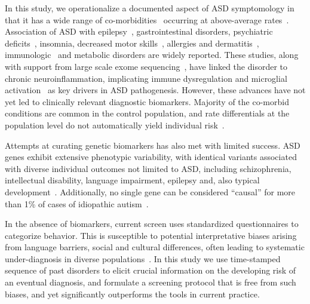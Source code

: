 \documentclass[3p,super,numbers,sort&compress,preprint,10pt]{elsarticle}
\begin{document}
In this study, we operationalize a documented aspect of ASD symptomology in  that it has   a wide range  of co-morbidities~\cite{pmid22511918,pmid30733689,pmid25681541} occurring at above-average  rates~\cite{hyman2020identification}.
%
Association of ASD  with epilepsy~\cite{pmid23935565}, gastrointestinal disorders\cite{pmid30646068,pmid21651783,pmid30823414,pmid21282636,pmid29028817,pmid30109601}, psychiatric deficits~\cite{pmid24729779}, insomnia, decreased motor skills~\cite{pmid30337860}, allergies and  dermatitis~\cite{pmid30646068,pmid21651783,pmid30823414,pmid21282636,pmid29028817,pmid30109601}, immunologic~\cite{pmid30971960,pmid30941018,pmid29691724,pmid29307081,pmid27351598,pmid26793298,pmid30095240,pmid25681541} and metabolic\cite{pmid30178105,pmid27957319,pmid29028817} disorders are  widely reported. These studies, along with support from large scale exome sequencing~\cite{Satterstrom484113,pmid25038753}, have linked the disorder to chronic neuroinflammation,  implicating immune dysregulation and microglial activation~\cite{pmid15546155,pmid21595886,pmid21629840,pmid26793298,pmid30483058,pmid29691724} as  key drivers in ASD pathogenesis. However, these advances have not yet led  to %
clinically relevant diagnostic biomarkers.  Majority of the co-morbid conditions are common in the control population, and  rate differentials at the population level do not automatically yield individual risk~\cite{Pearce2000}.

Attempts at curating genetic biomarkers has also met with limited success. ASD genes exhibit extensive phenotypic variability, with identical variants associated with diverse individual outcomes not limited to ASD, including schizophrenia, intellectual disability, language impairment, epilepsy and, also typical development~\cite{pmid23537858}.
Additionally, no single
gene can be considered ``causal'' for more than 1\% of cases
of idiopathic autism~\cite{pmid23637569}.

In the absence of biomarkers,  current screen uses standardized  questionnaires to categorize behavior. This is  susceptible to potential interpretative biases arising from language barriers, social and cultural differences, often leading to systematic under-diagnosis in diverse populations~\cite{hyman2020identification}. In this study we use  time-stamped sequence of past  disorders  to elicit crucial information on the developing risk of an eventual  diagnosis, and formulate a screening protocol that is free from such biases, and yet significantly outperforms the tools in current practice.
\end{document}
